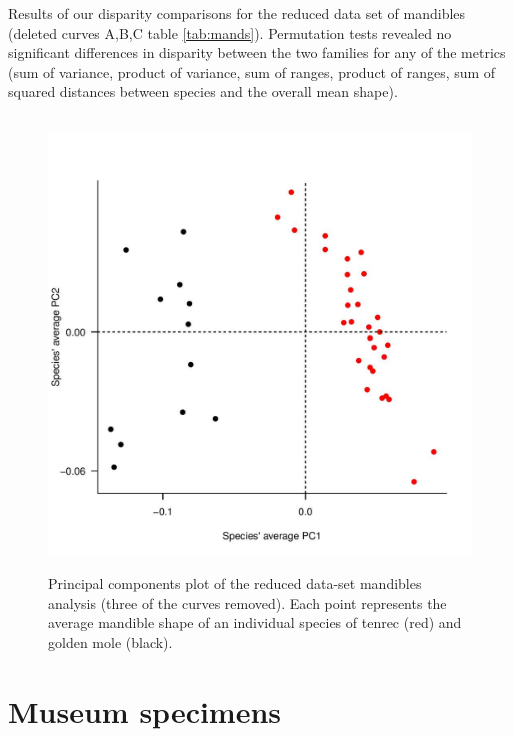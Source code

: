 \documentclass[12pt,a4paper]{article}
\begin{document}
	\begin{table}[h]			
	\centering
	\caption{Results of our disparity comparisons for the reduced data set of mandibles (deleted curves A,B,C table \ref{tab:mands}). Permutation tests revealed no significant differences in disparity between the two families for any of the metrics (sum of variance, product of variance, sum of ranges, product of ranges, sum of squared distances between species and the overall mean shape). }
	
	\label{tab:mands_onecurve} 
	\end{table}

	\begin{figure}[H] 
 	\centering
  	\includegraphics[width=12cm, height=12cm, keepaspectratio=true]
  	{figures/Mandibles_trc+gmole_onecurve_PCA.jpg}
    \caption {Principal components plot of the reduced data-set mandibles analysis (three of the curves removed). Each point represents the average mandible shape of an individual species of tenrec (red) and golden mole (black).}
  	\label{fig:mands_onecurvePCA}
  	\end{figure}

\newpage
\section{Museum specimens}
	



\end{document}
